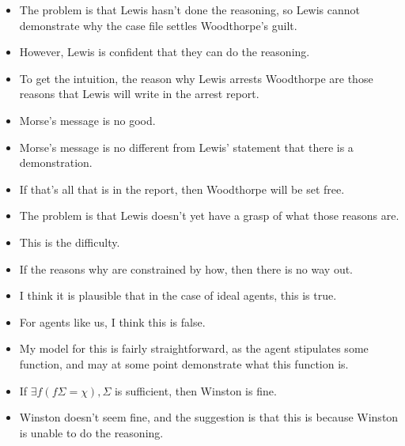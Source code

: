 \documentclass[10pt]{article}
\newcommand{\hozline}[0]{%
  \noindent\hdashrule[0.5ex][c]{\textwidth}{.1pt}{}
}
\newcommand{\hozlinedash}[0]{%
  \noindent\hdashrule[0.5ex][c]{\textwidth}{.1pt}{2.5pt}
}
\begin{document}
\begin{itemize}
\item The problem is that Lewis hasn't done the reasoning, so Lewis cannot demonstrate why the case file settles Woodthorpe's guilt.
\item However, Lewis is confident that they can do the reasoning.
\end{itemize}

\begin{itemize}
\item To get the intuition, the reason why Lewis arrests Woodthorpe are those reasons that Lewis will write in the arrest report.
\item Morse's message is no good.
\item Morse's message is no different from Lewis' statement that there is a demonstration.
\item If that's all that is in the report, then Woodthorpe will be set free.
\item The problem is that Lewis doesn't yet have a grasp of what those reasons are.
\item This is the difficulty.
\item If the reasons why are constrained by how, then there is no way out.
\item I think it is plausible that in the case of ideal agents, this is true.
\item For agents like us, I think this is false.
\end{itemize}

\begin{itemize}
\item My model for this is fairly straightforward, as the agent stipulates some function, and may at some point demonstrate what this function is.
\end{itemize}

\hozlinedash

\begin{itemize}
\item If \(\exists f(f\Sigma = \chi), \Sigma\) is sufficient, then Winston is fine.
\item Winston doesn't seem fine, and the suggestion is that this is because Winston is unable to do the reasoning.
\end{itemize}

\hozline
\end{document}
